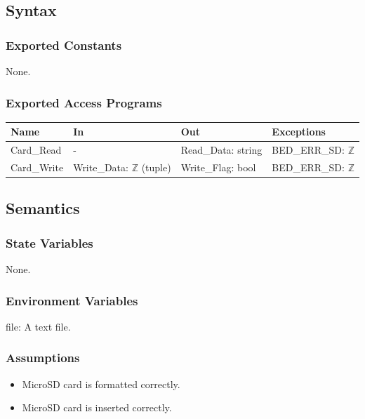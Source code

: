 \documentclass[12pt, titlepage]{article}
\begin{document}
\subsection{Syntax}

\subsubsection{Exported Constants}

None.

\subsubsection{Exported Access Programs}

\begin{center}
\begin{tabular}{p{2cm} p{4cm} p{3.5cm} p{4cm}}
\hline
\textbf{Name} & \textbf{In} & \textbf{Out} & \textbf{Exceptions} \\
\hline
Card\_Read & - & Read\_Data: string & BED\_ERR\_SD: $\mathbb{Z}$ \\
Card\_Write & Write\_Data: $\mathbb{Z}$ (tuple) & Write\_Flag: bool & BED\_ERR\_SD: $\mathbb{Z}$ \\
\hline
\end{tabular}
\end{center}

\subsection{Semantics}

\subsubsection{State Variables}

None.

\subsubsection{Environment Variables}

file: A text file.

\subsubsection{Assumptions}
\begin{itemize}
\item MicroSD card is formatted correctly.
\item MicroSD card is inserted correctly.
\end{itemize}
\end{document}
